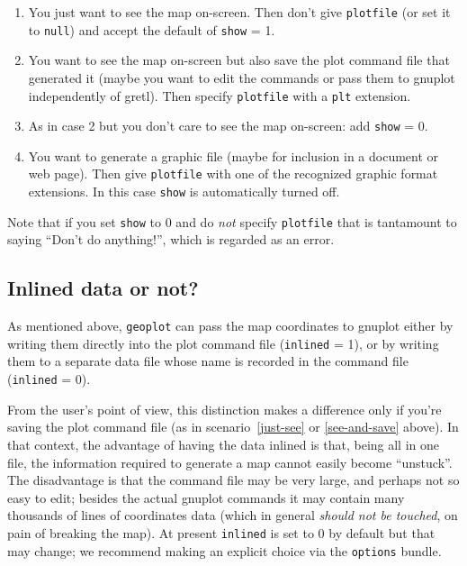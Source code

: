 \documentclass{article}
\begin{document}
\begin{enumerate}
\item You just want to see the map on-screen. Then don't give
  \texttt{plotfile} (or set it to \texttt{null}) and accept the
  default of \texttt{show} = 1.\label{just-see}
\item You want to see the map on-screen but also save the plot command
  file that generated it (maybe you want to edit the commands or pass
  them to \textsf{gnuplot} independently of gretl). Then specify
  \texttt{plotfile} with a \texttt{plt} extension.\label{see-and-save}
\item As in case 2 but you don't care to see the map on-screen: add
  \texttt{show} = 0.
\item You want to generate a graphic file (maybe for inclusion in a
  document or web page). Then give \texttt{plotfile} with one of the
  recognized graphic format extensions. In this case \texttt{show} is
  automatically turned off.
\end{enumerate}

Note that if you set \texttt{show} to 0 and do \textit{not} specify
\texttt{plotfile} that is tantamount to saying ``Don't do anything!'',
which is regarded as an error.

\subsection{Inlined data or not?}

As mentioned above, \texttt{geoplot} can pass the map coordinates to
\textsf{gnuplot} either by writing them directly into the plot command
file (\texttt{inlined} = 1), or by writing them to a separate data
file whose name is recorded in the command file (\texttt{inlined} =
0).

From the user's point of view, this distinction makes a difference
only if you're saving the plot command file (as in
scenario~\ref{just-see} or \ref{see-and-save} above).  In that
context, the advantage of having the data inlined is that, being all
in one file, the information required to generate a map cannot easily
become ``unstuck''. The disadvantage is that the command file may be
very large, and perhaps not so easy to edit; besides the actual
\textsf{gnuplot} commands it may contain many thousands of lines of
coordinates data (which in general \textit{should not be touched}, on
pain of breaking the map). At present \texttt{inlined} is set to
0 by default but that may change; we recommend making an explicit
choice via the \texttt{options} bundle.
\end{document}
